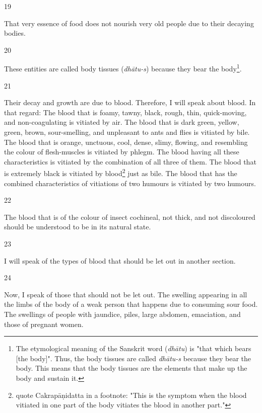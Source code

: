 \begin{translation}
\item[19]

That very essence of food does not nourish very old people due to their decaying bodies.

\item[20]

These entities are called body tissues (\emph{dhātu-s}) because they bear the body\footnote{The etymological meaning of the Sanskrit word  (\emph{dhātu}) is "that which bears [the body]". Thus, the body tissues are called \emph{dhātu-s} because they bear the body. This means that the body tissues are the elements that make up the body and sustain it.}. 

\item[21]

Their decay and growth are due to blood. Therefore, I will speak about blood. 
In that regard: The blood that is foamy, tawny, black, rough, thin, quick-moving, and non-coagulating is vitiated by air. The blood that is dark green, yellow, green, brown, sour-smelling, and unpleasant to ants and flies is vitiated by bile. The blood that is orange, unctuous, cool, dense, slimy, flowing, and resembling the colour of flesh-muscles is vitiated by phlegm. The blood having all these characteristics is vitiated by the combination of all three of them. The blood that is extremely black is vitiated by blood\footnote{\citet[64]{vulgate} quote Cakrapāṇidatta in a footnote: "This is the symptom when the blood vitiated in one part of the body vitiates the blood in another part."} just as bile. The blood that has the combined characteristics of vitiations of two humours is vitiated by two humours.

\item[22]

The blood that is of the colour of insect cochineal, not thick, and not discoloured should be understood to be in its natural state. 

\item[23]

I will speak of the types of blood that should be let out in another section. 

\item[24]

Now, I speak of those that should not be let out.
The swelling appearing in all the limbs of the body of a weak person that happens due to consuming sour food. The swellings of people with jaundice, piles, large abdomen, emaciation, and those of pregnant women.


\end{translation}

